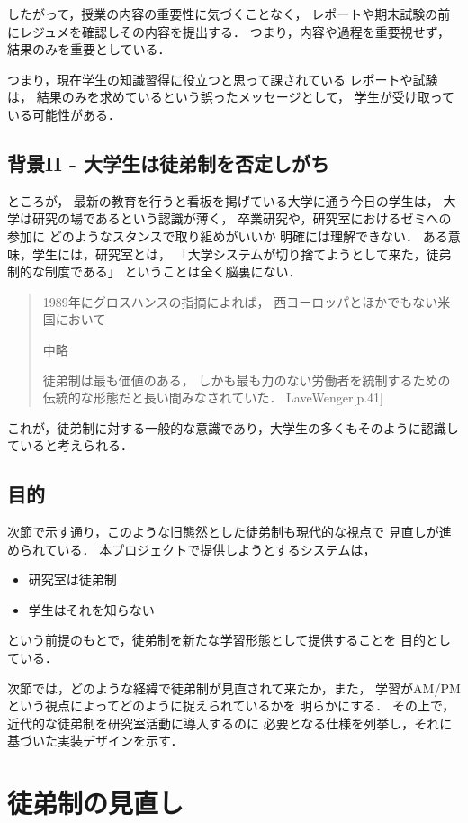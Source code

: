 \documentclass{jsarticle}
\begin{document}
したがって，授業の内容の重要性に気づくことなく，
レポートや期末試験の前にレジュメを確認しその内容を提出する．
つまり，内容や過程を重要視せず，結果のみを重要としている．

つまり，現在学生の知識習得に役立つと思って課されている
レポートや試験は，
結果のみを求めているという誤ったメッセージとして，
学生が受け取っている可能性がある．

\subsection{背景II - 大学生は徒弟制を否定しがち}
\label{sec:org02ac0ec}
ところが，
最新の教育を行うと看板を掲げている大学に通う今日の学生は，
大学は研究の場であるという認識が薄く，
卒業研究や，研究室におけるゼミへの参加に
どのようなスタンスで取り組めがいいか
明確には理解できない．
ある意味，学生には，研究室とは，
「大学システムが切り捨てようとして来た，徒弟制的な制度である」
ということは全く脳裏にない．
\begin{quote}
1989年にグロスハンスの指摘によれば，
西ヨーロッパとほかでもない米国において

中略

徒弟制は最も価値のある，
しかも最も力のない労働者を統制するための伝統的な形態だと長い間みなされていた．
LaveWenger[p.41]
\end{quote}
これが，徒弟制に対する一般的な意識であり，大学生の多くもそのように認識していると考えられる．

\subsection{目的}
\label{sec:org0923809}
次節で示す通り，このような旧態然とした徒弟制も現代的な視点で
見直しが進められている．
本プロジェクトで提供しようとするシステムは，
\begin{itemize}
\item 研究室は徒弟制
\item 学生はそれを知らない
\end{itemize}
という前提のもとで，徒弟制を新たな学習形態として提供することを
目的としている．

次節では，どのような経緯で徒弟制が見直されて来たか，また，
学習がAM/PMという視点によってどのように捉えられているかを
明らかにする．
その上で，近代的な徒弟制を研究室活動に導入するのに
必要となる仕様を列挙し，それに基づいた実装デザインを示す．

\section{徒弟制の見直し}
\label{sec:org8d66141}
\end{document}
